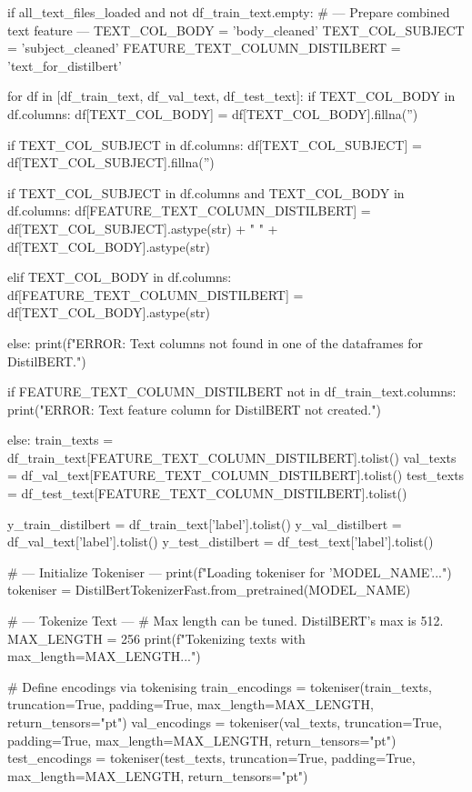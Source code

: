 \begin{ffcode}
if all_text_files_loaded and not df_train_text.empty:
    # --- Prepare combined text feature ---
    TEXT_COL_BODY = 'body_cleaned'
    TEXT_COL_SUBJECT = 'subject_cleaned'
    FEATURE_TEXT_COLUMN_DISTILBERT = 'text_for_distilbert'

    for df in [df_train_text, df_val_text, df_test_text]:
        if TEXT_COL_BODY in df.columns:
            df[TEXT_COL_BODY] = df[TEXT_COL_BODY].fillna('')

        if TEXT_COL_SUBJECT in df.columns:
            df[TEXT_COL_SUBJECT] = df[TEXT_COL_SUBJECT].fillna('')

        if TEXT_COL_SUBJECT in df.columns and TEXT_COL_BODY in df.columns:
            df[FEATURE_TEXT_COLUMN_DISTILBERT] = df[TEXT_COL_SUBJECT].astype(str) + " " + df[TEXT_COL_BODY].astype(str)

        elif TEXT_COL_BODY in df.columns:
            df[FEATURE_TEXT_COLUMN_DISTILBERT] = df[TEXT_COL_BODY].astype(str)

        else:
            print(f"ERROR: Text columns not found in one of the dataframes for DistilBERT.")

    if FEATURE_TEXT_COLUMN_DISTILBERT not in df_train_text.columns:
        print("ERROR: Text feature column for DistilBERT not created.")

    else:
        train_texts = df_train_text[FEATURE_TEXT_COLUMN_DISTILBERT].tolist()
        val_texts = df_val_text[FEATURE_TEXT_COLUMN_DISTILBERT].tolist()
        test_texts = df_test_text[FEATURE_TEXT_COLUMN_DISTILBERT].tolist()

        y_train_distilbert = df_train_text['label'].tolist()
        y_val_distilbert = df_val_text['label'].tolist()
        y_test_distilbert = df_test_text['label'].tolist()

        # --- Initialize Tokeniser ---
        print(f"Loading tokeniser for '{MODEL_NAME}'...")
        tokeniser = DistilBertTokenizerFast.from_pretrained(MODEL_NAME)

        # --- Tokenize Text ---
        # Max length can be tuned. DistilBERT's max is 512.
        MAX_LENGTH = 256
        print(f"Tokenizing texts with max_length={MAX_LENGTH}...")

        # Define encodings via tokenising
        train_encodings = tokeniser(train_texts, truncation=True, padding=True, max_length=MAX_LENGTH, return_tensors="pt")
        val_encodings = tokeniser(val_texts, truncation=True, padding=True, max_length=MAX_LENGTH, return_tensors="pt")
        test_encodings = tokeniser(test_texts, truncation=True, padding=True, max_length=MAX_LENGTH, return_tensors="pt")


\end{ffcode}
